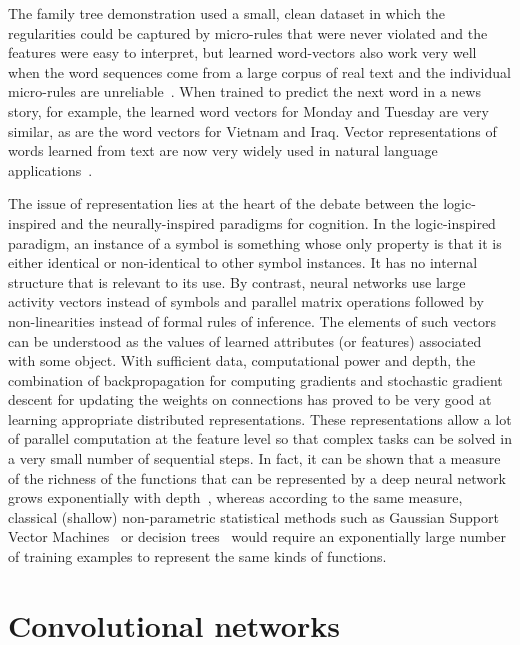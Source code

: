 \documentclass[10pts]{article}
\begin{document}
The family tree demonstration used a small, clean dataset in which the
regularities could be captured by micro-rules that were never violated and
the features were easy to interpret, but learned word-vectors also work
very well when the word sequences come from a large corpus of real text and
the individual micro-rules are unreliable~\citep{BenDucVin01-short}. When trained to
predict the next word in a news story, for example, the learned word
vectors for Monday and Tuesday are very similar, as are the word vectors
for Vietnam and Iraq.  Vector representations of words learned from text
are now very widely used in natural language 
applications~\citep{Schwenk-2007,collobert:2011b,Socher-2011,Mikolov-et-al-NIPS2013}.

The issue of representation lies at the heart of the debate between the
logic-inspired and the neurally-inspired paradigms for cognition. In the
logic-inspired paradigm, an instance of a symbol is something whose only
property is that it is either identical or non-identical to other symbol
instances. It has no internal structure that is relevant to its use. By
contrast, neural networks use large activity vectors instead of symbols and
parallel matrix operations followed by non-linearities instead of formal
rules of inference. The elements of such vectors can be understood as
the values of learned attributes (or features) associated with some object. 
With sufficient data, computational power and depth,
the combination of backpropagation for computing gradients and stochastic
gradient descent for updating the weights on connections has proved to be
very good at learning appropriate distributed representations. These
representations allow a lot of parallel computation at the feature level so
that complex tasks can be solved in a very small number of sequential
steps. In fact, it can be shown that a measure of the richness of the functions
that can be represented by a deep neural network grows exponentially
with depth~\citep{Montufar-et-al-NIPS2014}, whereas according to the
same measure, classical (shallow) non-parametric statistical methods such as
Gaussian Support Vector Machines~\citep{Bengio-localfailure-NIPS-2006-small} 
or decision trees~\citep{Bengio-decision-trees10}
would require an exponentially large number
of training examples to represent the same kinds of functions.

\section{Convolutional networks}
\end{document}
